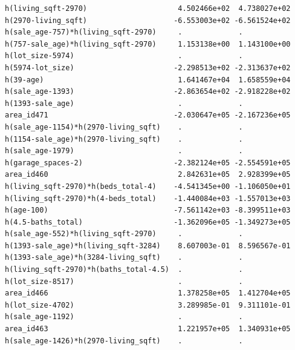 \documentclass[
]{article}
\begin{document}
\begin{verbatim}
h(living_sqft-2970)                     4.502466e+02  4.738027e+02
h(2970-living_sqft)                    -6.553003e+02 -6.561524e+02
h(sale_age-757)*h(living_sqft-2970)     .             .           
h(757-sale_age)*h(living_sqft-2970)     1.153138e+00  1.143100e+00
h(lot_size-5974)                        .             .           
h(5974-lot_size)                       -2.298513e+02 -2.313637e+02
h(39-age)                               1.641467e+04  1.658559e+04
h(sale_age-1393)                       -2.863654e+02 -2.918228e+02
h(1393-sale_age)                        .             .           
area_id471                             -2.030647e+05 -2.167236e+05
h(sale_age-1154)*h(2970-living_sqft)    .             .           
h(1154-sale_age)*h(2970-living_sqft)    .             .           
h(sale_age-1979)                        .             .           
h(garage_spaces-2)                     -2.382124e+05 -2.554591e+05
area_id460                              2.842631e+05  2.928399e+05
h(living_sqft-2970)*h(beds_total-4)    -4.541345e+00 -1.106050e+01
h(living_sqft-2970)*h(4-beds_total)    -1.440084e+03 -1.557013e+03
h(age-100)                             -7.561142e+03 -8.399511e+03
h(4.5-baths_total)                     -1.362096e+05 -1.349273e+05
h(sale_age-552)*h(living_sqft-2970)     .             .           
h(1393-sale_age)*h(living_sqft-3284)    8.607003e-01  8.596567e-01
h(1393-sale_age)*h(3284-living_sqft)    .             .           
h(living_sqft-2970)*h(baths_total-4.5)  .             .           
h(lot_size-8517)                        .             .           
area_id466                              1.378258e+05  1.412704e+05
h(lot_size-4702)                        3.289985e-01  9.311101e-01
h(sale_age-1192)                        .             .           
area_id463                              1.221957e+05  1.340931e+05
h(sale_age-1426)*h(2970-living_sqft)    .             .           
                                                                  

\end{verbatim}
\end{document}
